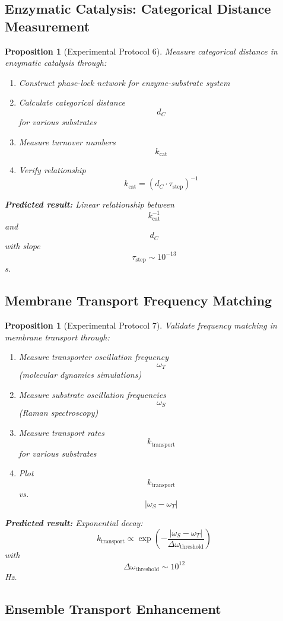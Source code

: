 \documentclass[12pt,a4paper]{article}
\newtheorem{proposition}[theorem]{Proposition}
\begin{document}
\subsection{Enzymatic Catalysis: Categorical Distance Measurement}

\begin{proposition}[Experimental Protocol 6]
Measure categorical distance in enzymatic catalysis through:
\begin{enumerate}
\item Construct phase-lock network for enzyme-substrate system
\item Calculate categorical distance $$d_C$$ for various substrates
\item Measure turnover numbers $$k_{\text{cat}}$$
\item Verify relationship $$k_{\text{cat}} = (d_C \cdot \tau_{\text{step}})^{-1}$$
\end{enumerate}

\textbf{Predicted result:}
Linear relationship between $$k_{\text{cat}}^{-1}$$ and $$d_C$$ with slope $$\tau_{\text{step}} \sim 10^{-13}$$ s.
\end{proposition}

\subsection{Membrane Transport Frequency Matching}

\begin{proposition}[Experimental Protocol 7]
Validate frequency matching in membrane transport through:
\begin{enumerate}
\item Measure transporter oscillation frequency $$\omega_T$$ (molecular dynamics simulations)
\item Measure substrate oscillation frequencies $$\omega_S$$ (Raman spectroscopy)
\item Measure transport rates $$k_{\text{transport}}$$ for various substrates
\item Plot $$k_{\text{transport}}$$ vs. $$|\omega_S - \omega_T|$$
\end{enumerate}

\textbf{Predicted result:}
Exponential decay:
$$
k_{\text{transport}} \propto \exp\left(-\frac{|\omega_S - \omega_T|}{\Delta\omega_{\text{threshold}}}\right)
$$
with $$\Delta\omega_{\text{threshold}} \sim 10^{12}$$ Hz.
\end{proposition}

\subsection{Ensemble Transport Enhancement}
\end{document}
